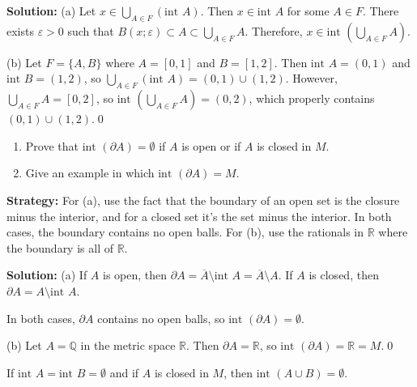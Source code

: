 \bigskip\noindent\textbf{Solution:} 
(a) Let $x \in \bigcup_{A \in F} (\text{int } A)$. Then $x \in \text{int } A$ for some $A \in F$. There exists $\varepsilon > 0$ such that $B(x;\varepsilon) \subset A \subset \bigcup_{A \in F} A$. Therefore, $x \in \text{int }(\bigcup_{A \in F} A)$.

(b) Let $F = \{A, B\}$ where $A = [0,1]$ and $B = [1,2]$. Then $\text{int } A = (0,1)$ and $\text{int } B = (1,2)$, so $\bigcup_{A \in F} (\text{int } A) = (0,1) \cup (1,2)$. However, $\bigcup_{A \in F} A = [0,2]$, so $\text{int }(\bigcup_{A \in F} A) = (0,2)$, which properly contains $(0,1) \cup (1,2)$.\qed


\begin{problembox}
\begin{problemstatement}
\begin{enumerate}[label=\alph*)]
\item Prove that \(\text{int } (\partial A) = \emptyset\) if \( A \) is open or if \( A \) is closed in \( M \).
\item Give an example in which \(\text{int } (\partial A) = M\).
\end{enumerate}
\end{problemstatement}
\end{problembox}

\noindent\textbf{Strategy:} For (a), use the fact that the boundary of an open set is the closure minus the interior, and for a closed set it's the set minus the interior. In both cases, the boundary contains no open balls. For (b), use the rationals in $\mathbb{R}$ where the boundary is all of $\mathbb{R}$.

\bigskip\noindent\textbf{Solution:} 
(a) If $A$ is open, then $\partial A = \overline{A} \setminus \text{int } A = \overline{A} \setminus A$. If $A$ is closed, then $\partial A = A \setminus \text{int } A$.

In both cases, $\partial A$ contains no open balls, so $\text{int } (\partial A) = \emptyset$.

(b) Let $A = \mathbb{Q}$ in the metric space $\mathbb{R}$. Then $\partial A = \mathbb{R}$, so $\text{int } (\partial A) = \mathbb{R} = M$.\qed


\begin{problembox}
\begin{problemstatement}
If \(\text{int } A = \text{int } B = \emptyset\) and if \(A\) is closed in \(M\), then \(\text{int } (A \cup B) = \emptyset\).
\end{problemstatement}
\end{problembox}


